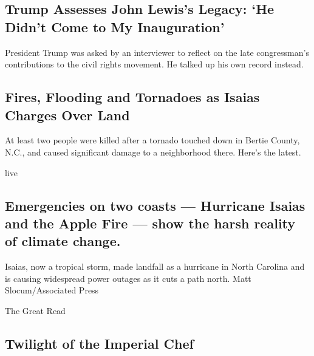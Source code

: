 \href{/2020/08/04/us/politics/trump-john-lewis-axios.html}{}

\hypertarget{trump-assesses-john-lewiss-legacy-he-didnt-come-to-my-inauguration}{%
\subsection{Trump Assesses John Lewis's Legacy: `He Didn't Come to My
Inauguration'}\label{trump-assesses-john-lewiss-legacy-he-didnt-come-to-my-inauguration}}

President Trump was asked by an interviewer to reflect on the late
congressman's contributions to the civil rights movement. He talked up
his own record instead.

\href{/2020/08/04/us/isaias-storm-updates.html}{}

\hypertarget{fires-flooding-and-tornadoes-as-isaias-charges-over-land}{%
\subsection{Fires, Flooding and Tornadoes as Isaias Charges Over
Land}\label{fires-flooding-and-tornadoes-as-isaias-charges-over-land}}

At least two people were killed after a tornado touched down in Bertie
County, N.C., and caused significant damage to a neighborhood there.
Here's the latest.

live

\href{/2020/08/04/climate/hurricane-isaias-apple-fire-climate.html}{}

\hypertarget{emergencies-on-two-coasts--hurricane-isaias-and-the-apple-fire--show-the-harsh-reality-of-climate-change}{%
\subsection{Emergencies on two coasts --- Hurricane Isaias and the Apple
Fire --- show the harsh reality of climate
change.}\label{emergencies-on-two-coasts--hurricane-isaias-and-the-apple-fire--show-the-harsh-reality-of-climate-change}}

Isaias, now a tropical storm, made landfall as a hurricane in North
Carolina and is causing widespread power outages as it cuts a path
north. Matt Slocum/Associated Press

\href{/2020/08/04/dining/chef-restaurant-culture.html}{}

The Great Read

\hypertarget{twilight-of-the-imperial-chef}{%
\subsection{Twilight of the Imperial
Chef}\label{twilight-of-the-imperial-chef}}


